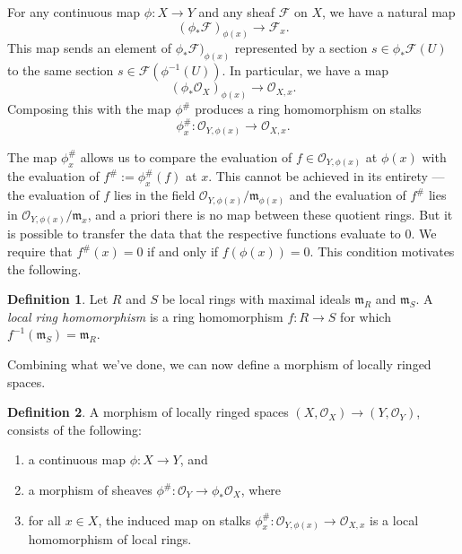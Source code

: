 \documentclass[a4,12pt]{article}
\theoremstyle{definition}
\newtheorem{definition}{Definition}[section]
\theoremstyle{remark}
\theoremstyle{plain}
\numberwithin{equation}{section}
\newcommand{\2}[4]{\begin{bmatrix}#1 & #2 \\ #3 & #4 \end{bmatrix}} %
\newcommand{\3}[9]{\begin{bmatrix}#1 & #2 & #3 \\ #4 & #5 & #6 \\ #7 & #8 & #9 \end{bmatrix}} %
\begin{document}
For any continuous map \(\phi \colon X \to Y\) and any sheaf \(\mathcal{F}\) on \(X\), we have a natural map
\[ (\phi_{*} \mathcal{F})_{\phi(x)} \to \mathcal{F}_x.\]
This map sends an element of \(\phi_{*} \mathcal{F})_{\phi(x)}\) represented by a section \(s \in \phi_{*} \mathcal{F} (U)\) to the same section \(s \in \mathcal{F}(\phi^{-1}(U))\).
In particular, we have a map
\begin{equation}
(\phi_\ast \mathcal{O}_X)_{\phi(x)}  	\to 	\mathcal{O}_{X,x}. \label{FirstStalkMap}
\end{equation}
Composing this with the map $\phi^\#$ produces a ring homomorphism on stalks
\[\phi_x^\# : \mathcal{O}_{Y,\phi(x)} \to \mathcal{O}_{X,x}.\] 

The map \(\phi_x^{\#}\) allows us to compare the evaluation of \(f \in \mathcal{O}_{Y, \phi(x)}\) at \(\phi(x)\) with the evaluation of \(f^{\#} := \phi_x^{\#}(f)\) at \(x\).
This cannot be achieved in its entirety --- the evaluation of \(f\) lies in the field \(\mathcal{O}_{Y, \phi(x)}/ \mathfrak m_{\phi (x)}\) and the evaluation of \(f^{\#}\) lies in \(\mathcal{O}_{Y, \phi(x)}/ \mathfrak m_x\), and a priori there is no map between these quotient rings.
But it is possible to transfer the data that the respective functions evaluate to \(0\).
We require that \(f^{\#}(x) = 0\) if and only if \(f(\phi(x)) = 0\).
This condition motivates the following.
\begin{definition}
  Let \(R\) and \(S\) be local rings with maximal ideals \(\mathfrak{m}_R\) and \(\mathfrak{m}_{S}\).
A \emph{local ring homomorphism} is a ring homomorphism $f: R \to S$ for which $f^{-1}(\mathfrak{m}_S) = \mathfrak{m}_R$.
\end{definition}

Combining what we've done, we can now define a morphism of locally ringed spaces.

\begin{definition}
A morphism of locally ringed spaces $(X,\mathcal{O}_X) \to (Y,\mathcal{O}_Y)$, consists of the following:
\begin{enumerate}
\item a continuous map $\phi : X \to Y$, and
\item a morphism of sheaves $\phi^\# : \mathcal{O}_Y \to \phi_\ast\mathcal{O}_X$, where
\item for all $x \in X$, the induced map on stalks $\phi_x^\# : \mathcal{O}_{Y,\phi(x)} \to \mathcal{O}_{X,x}$ is a local homomorphism of local rings.
\end{enumerate}
\end{definition}
\end{document}
